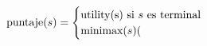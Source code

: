 \documentclass[preview]{standalone}
\begin{document}
\begin{align*}
\text{puntaje($s$)} =  \begin{cases}\text{utility(s) si $s$ es terminal} \cr
                                 \text{minimax($s$)}( \cr
                                 \end{cases}
\end{align*}
\end{document}
